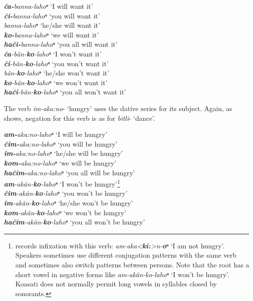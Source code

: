 \documentclass[output=paper,colorlinks,citecolor=brown]{langscibook}
\begin{document}
\ea\label{ex:koa:15}
    \textit{\textbf{ča-}banna-lahoⁿ} \tab ‘I will want it’  \\
    \textit{\textbf{či-}banna-lahoⁿ} \tab ‘you will want it’ \\
    \textit{banna-lahoⁿ} \tab ‘he/she will want it’ \\
    \textit{\textbf{ko-}banna-lahoⁿ} \tab ‘we will want it’ \\
    \textit{\textbf{hači-}banna-lahoⁿ} \tab  ‘you all will want it’ \\
\vspace{2mm}
    \textit{\textbf{ča}-bǎn-\textbf{ko}-lahoⁿ} \tab  ‘I won’t want it’ \\
    \textit{\textbf{či}-bǎn-\textbf{ko}-lahoⁿ} \tab  ‘you won’t want it’ \\
    \textit{bǎn-\textbf{ko}-lahoⁿ} \tab ‘he/she won’t want it’ \\
    \textit{\textbf{ko}-bǎn-\textbf{ko}-lahoⁿ} \tab ‘we won’t want it’ \\
    \textit{\textbf{hači}-bǎn-\textbf{ko}-lahoⁿ} \tab ‘you all won’t want it’ \\
\z

The verb \textit{im-aka:no}- ‘hungry’ uses the dative series for its subject. Again, as  shows, negation for this verb is as for \textit{bitli}- ‘dance’.

\ea\label{ex:koa:16}
    \textit{\textbf{am-}aka:no-lahoⁿ} \tab ‘I will be hungry’ \\
    \textit{\textbf{čim-}aka:no-lahoⁿ} \tab ‘you will be hungry’ \\
    \textit{\textbf{im-}aka:no-lahoⁿ} \tab ‘he/she will be hungry’ \\
    \textit{\textbf{kom-}aka:no-lahoⁿ} \tab ‘we will be hungry’ \\
    \textit{\textbf{hačim-}aka:no-lahoⁿ} \tab ‘you all will be hungry’ \\
\vspace{2mm}
    \textit{\textbf{am}-akǎn-\textbf{ko}-lahoⁿ} \tab ‘I won’t be hungry’\footnote{\citet[73]{Kimball1991} records infixation with this verb: \textit{am-aka<}\textbf{\textit{k\v{i}:}}\textit{>n-}\textbf{\textit{o}}\textit{ⁿ} ‘I am not hungry’. Speakers sometimes use different conjugation patterns with the same verb and sometimes also switch patterns between persons. Note that the root has a short vowel in negative forms like \textit{am-akǎn-ko-lahoⁿ} ‘I won’t be hungry’. Koasati does not normally permit long vowels in syllables closed by sonorants.} \\
    \textit{\textbf{č}\textbf{im}-akǎn-\textbf{ko}-lahoⁿ} \tab ‘you won’t be hungry’ \\
    \textit{\textbf{im}-akǎn-\textbf{ko}-lahoⁿ} \tab ‘he/she won’t be hungry’ \\
    \textit{\textbf{kom}-akǎn-\textbf{ko}-lahoⁿ} \tab ‘we won’t be hungry’ \\
    \textit{\textbf{ha}\textbf{č}\textbf{im}-akǎn-\textbf{ko}-lahoⁿ} \tab ‘you all won’t be hungry’ \\
\z 
\end{document}
